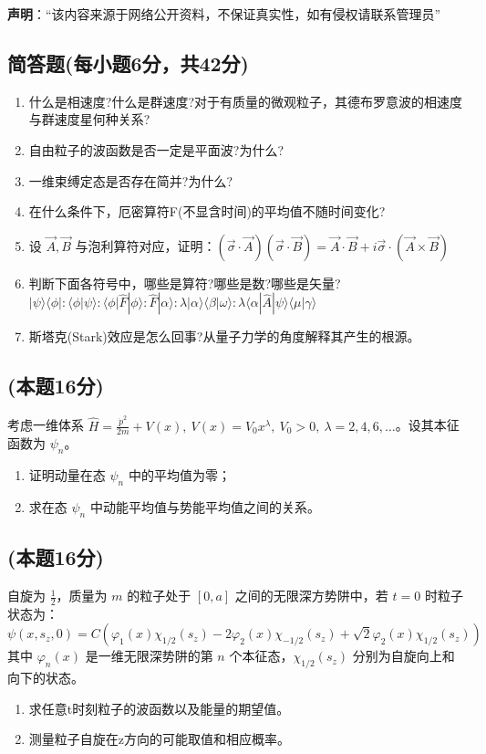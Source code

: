 
\textbf{声明}：“该内容来源于网络公开资料，不保证真实性，如有侵权请联系管理员”

\subsection{简答题(每小题6分，共42分)}
\begin{enumerate}
\item 什么是相速度?什么是群速度?对于有质量的微观粒子，其德布罗意波的相速度与群速度星何种关系?
\item 自由粒子的波函数是否一定是平面波?为什么?
\item 一维束缚定态是否存在简并?为什么?
\item 在什么条件下，厄密算符F(不显含时间)的平均值不随时间变化?
\item 设 $\vec{A}, \vec{B}$ 与泡利算符对应，证明：$\left( \vec{\sigma} \cdot \vec{A} \right) \left( \vec{\sigma} \cdot \vec{B} \right) = \vec{A} \cdot \vec{B} + i \vec{\sigma} \cdot \left( \vec{A} \times \vec{B} \right)$
\item 判断下面各符号中，哪些是算符?哪些是数?哪些是矢量?
$|\psi\rangle\langle\phi| : \langle\phi|\psi\rangle : \langle\phi|\hat{F}|\phi\rangle : \hat{F}|\alpha\rangle : \lambda |\alpha\rangle\langle\beta|\omega\rangle : \lambda \langle\alpha|\hat{A}|\psi\rangle\langle\mu|\gamma\rangle$
\item 斯塔克(Stark)效应是怎么回事?从量子力学的角度解释其产生的根源。
\end{enumerate}
\subsection{(本题16分)}
考虑一维体系 $\hat H = \frac{\dot p^2}{2m} + V(x),\ V(x) = V_0 x^\lambda,\ V_0 > 0,\ \lambda = 2, 4, 6, \ldots$。设其本征函数为 $\psi_n$。
\begin{enumerate}
\item 证明动量在态 $\psi_n$ 中的平均值为零；
\item 求在态 $\psi_n$ 中动能平均值与势能平均值之间的关系。
\end{enumerate}
\subsection{(本题16分)}
自旋为 $\frac{1}{2}$，质量为 $m$ 的粒子处于 $[0,a]$ 之间的无限深方势阱中，若 $t = 0$ 时粒子状态为：
$$\psi(x,s_z,0) = C \left( \varphi_1(x) \chi_{1/2}(s_z) - 2 \varphi_2(x) \chi_{-1/2}(s_z) + \sqrt{2} \varphi_2(x) \chi_{1/2}(s_z) \right)~$$
其中 $\varphi_n(x)$ 是一维无限深势阱的第 $n$ 个本征态，$\chi_{1/2}(s_z)$ 分别为自旋向上和向下的状态。
\begin{enumerate}
\item 求任意t时刻粒子的波函数以及能量的期望值。
\item 测量粒子自旋在z方向的可能取值和相应概率。
\end{enumerate}
